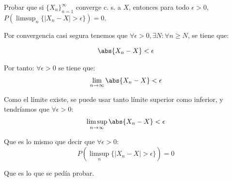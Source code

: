 \begin{problem}[8]Probar que si $\{X_n\}_{n=1}^{\infty}$  converge c. s. a $X$, entonces para todo $\epsilon > 0$,
$P(\limsup_n\{ |X_n - X| > \epsilon\}) = 0$.


\solution
Por convergencia casi segura tenemos que $\forall \epsilon > 0, \exists N: \forall n \geq N$, se tiene que:

\[
\abs{X_n -X} < \epsilon
\]

Por tanto: $\forall \epsilon > 0$ se tiene que:
\[
\lim_{n \rightarrow \infty} \abs{X_n -X} < \epsilon
\]

Como el límite existe, se puede usar tanto límite superior como inferior, y tendríamos que $\forall \epsilon > 0$:
\[
\limsup_{n \rightarrow \infty} \abs{X_n -X} < \epsilon
\]

Que es lo mismo que decir que $\forall \epsilon > 0$:
\[
P(\limsup_n\{ |X_n - X| > \epsilon\}) = 0
\]

Que es lo que se pedía probar.
\end{problem}


